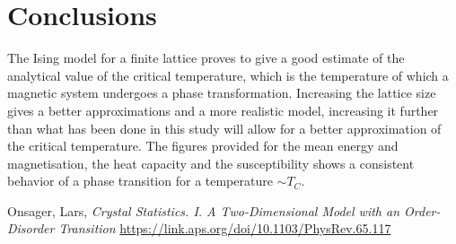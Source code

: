 \documentclass{emulateapj}
\begin{document}
\section{Conclusions}
\label{sec:conclusions}
The Ising model for a finite lattice proves to give a good estimate of the analytical value of the critical temperature, which is the temperature of which a magnetic system undergoes a phase transformation. Increasing the lattice size gives a better approximations and a more realistic model, increasing it further than what has been done in this study will allow for a better approximation of the critical temperature. The figures provided for the mean energy and magnetisation, the heat capacity and the susceptibility shows a consistent behavior of a phase transition for a temperature $\sim T_C$. 

\begin{thebibliography}{}
 Onsager, Lars,
 \textit{Crystal Statistics. I. A Two-Dimensional Model with an Order-Disorder Transition}
\url{https://link.aps.org/doi/10.1103/PhysRev.65.117}
\end{thebibliography}
\end{document}
